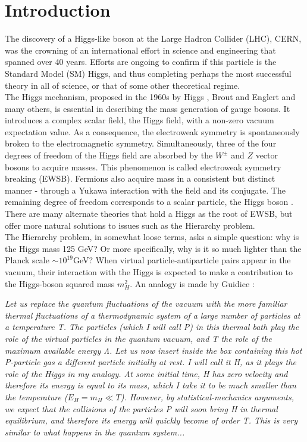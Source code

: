 \documentclass[a4paper]{jpconf}
\begin{document}
\section{Introduction}
The discovery of a Higgs-like boson \cite{cmsHiggs, atlasHiggs} at the Large Hadron Collider (LHC), CERN, was the crowning of an international effort in science and engineering that spanned over 40 years. Efforts are ongoing to confirm if this particle is the Standard Model (SM) Higgs, and thus completing perhaps the most successful theory in all of science, or that of some other theoretical regime. \\
\hfill\break
The Higgs mechanism, proposed in the 1960s by Higgs \cite{higgs}, Brout and Englert \cite{englert_brout} and many others, is essential in describing the mass generation of gauge bosons. It introduces a complex scalar field, the Higgs field, with a non-zero vacuum expectation value. As a consequence, the electroweak symmetry is spontaneously broken to the electromagnetic symmetry. Simultaneously, three of the four degrees of freedom of the Higgs field are absorbed by the \(W^\pm\) and \(Z\) vector bosons to acquire masses. This phenomenon is called electroweak symmetry breaking (EWSB). Fermions also acquire mass in a consistent but distinct manner - through a Yukawa interaction with the field and its conjugate. The remaining degree of freedom corresponds to a scalar particle, the Higgs boson \cite{djouadi}. There are many alternate theories that hold a Higgs as the root of EWSB, but offer more natural solutions to issues such as the Hierarchy problem. \\
\hfill\break
The Hierarchy problem, in somewhat loose terms, asks a simple question: why is the Higgs mass 125 GeV? Or more specifically, why is it so much lighter than the Planck scale \(\sim10^{19}\)GeV? When virtual particle-antiparticle pairs appear in the vacuum, their interaction with the Higgs is expected to make a contribution to the Higgs-boson squared mass \(m_{H}^2\). An analogy is made by Guidice \cite{guidice}: \\
\begin{adjustwidth}{1cm}{1cm}
\emph{Let us replace the quantum fluctuations of the vacuum with the more familiar thermal fluctuations of a thermodynamic system of a large number of particles at a temperature T. The particles (which I will call P) in this thermal bath play the role of the virtual particles in the quantum vacuum, and T the role of the maximum available energy Λ. Let us now insert inside the box containing this hot P-particle gas a different particle initially at rest. I will call it H, as it plays the role of the Higgs in my analogy. At some initial time, H has zero velocity and therefore its energy is equal to its mass, which I take it to be much smaller than the temperature (\(E_{H} = m_{H} \ll T\)). However, by statistical-mechanics arguments, we expect that the collisions of the particles P will soon bring H in thermal equilibrium, and therefore its energy will quickly become of order T. This is very similar to what happens in the quantum system...} \\
\end{adjustwidth}
\end{document}
